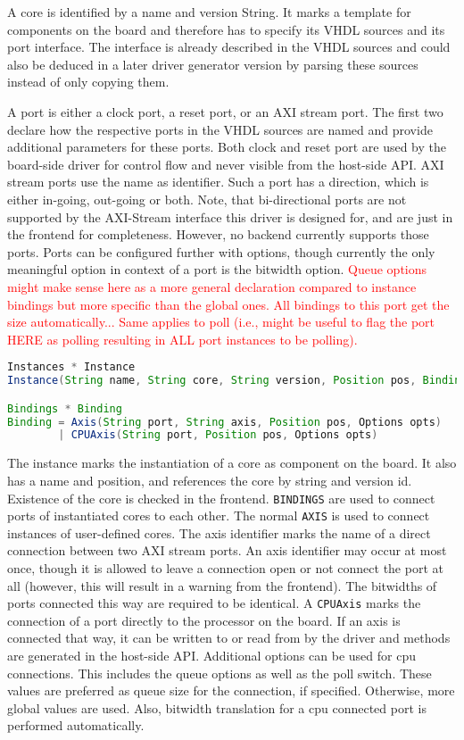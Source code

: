 \documentclass{report}
\begin{document}
A core is identified by a name and version String. It marks a template for components on the board and therefore has to specify its VHDL sources and its port interface. The interface is already described in the VHDL sources and could also be deduced in a later driver generator version by parsing these sources instead of only copying them.

A port is either a clock port, a reset port, or an AXI stream port. The first two declare how the respective ports in the VHDL sources are named and provide additional parameters for these ports. Both clock and reset port are used by the board-side driver for control flow and never visible from the host-side API.
AXI stream ports use the name as identifier. Such a port has a direction, which is either in-going, out-going or both. Note, that bi-directional ports are not supported by the AXI-Stream interface this driver is designed for, and are just in the frontend for completeness. However, no backend currently supports those ports.
Ports can be configured further with options, though currently the only meaningful option in context of a port is the bitwidth option. \textcolor{red}{Queue options might make sense here as a more general declaration compared to instance bindings but more specific than the global ones. All bindings to this port get the size automatically... Same applies to poll (i.e., might be useful to flag the port HERE as polling resulting in ALL port instances to be polling).}

\begin{lstlisting}[language=java, breaklines=true]
Instances * Instance
Instance(String name, String core, String version, Position pos, Bindings bind)

Bindings * Binding
Binding = Axis(String port, String axis, Position pos, Options opts)
        | CPUAxis(String port, Position pos, Options opts)
\end{lstlisting}

The instance marks the instantiation of a core as component on the board. It also has a name and position, and references the core by string and version id. Existence of the core is checked in the frontend. \texttt{BINDINGS} are used to connect ports of instantiated cores to each other. The normal \texttt{AXIS} is used to connect instances of user-defined cores. The axis identifier marks the name of a direct connection between two AXI stream ports. An axis identifier may occur at most once, though it is allowed to leave a connection open or not connect the port at all (however, this will result in a warning from the frontend). The bitwidths of ports connected this way are required to be identical.
A \texttt{CPUAxis} marks the connection of a port directly to the processor on the board. If an axis is connected that way, it can be written to or read from by the driver and methods are generated in the host-side API. Additional options can be used for cpu connections. This includes the queue options as well as the poll switch. These values are preferred as queue size for the connection, if specified. Otherwise, more global values are used. Also, bitwidth translation for a cpu connected port is performed automatically.
\end{document}
